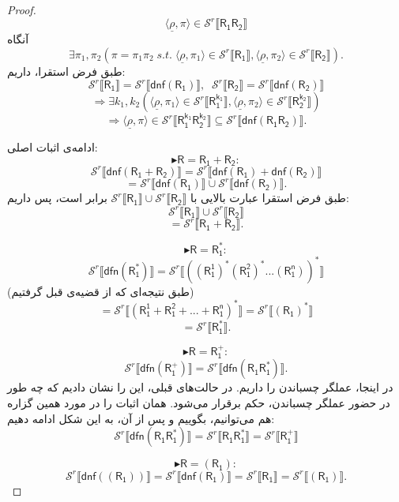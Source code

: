 \begin{proof}
	$$\langle \underline{\rho} ,\pi \rangle \in \mathcal{S}^r \llbracket \mathsf{R_1 R_2} \rrbracket$$
	آنگاه
	$$\exists \pi_1, \pi_2 ( \pi = \pi_1 \pi_2\;s.t.\;
	\langle \underline{\rho} , \pi_1 \rangle \in \mathcal{S}^r \llbracket \mathsf{R_1} \rrbracket
	,\langle \underline{\rho} , \pi_2 \rangle \in \mathcal{S}^r \llbracket \mathsf{R_2} \rrbracket).$$
	طبق فرض استقرا، داریم:
	$$\mathcal{S}^r \llbracket \mathsf{R_1} \rrbracket=
	\mathcal{S}^r \llbracket \mathsf{dnf(R_1)} \rrbracket, \;\;
	\mathcal{S}^r \llbracket \mathsf{R_2} \rrbracket=
	\mathcal{S}^r \llbracket \mathsf{dnf(R_2)} \rrbracket
	$$
	$$\Rightarrow
	\exists k_1,k_2 (\langle \underline{\rho} , \pi_1 \rangle \in 
	\mathcal{S}^r \llbracket \mathsf{R_1^{k_1}} \rrbracket,
	\langle \underline{\rho} , \pi_2 \rangle \in 
	\mathcal{S}^r \llbracket \mathsf{R_2^{k_2}} \rrbracket)$$
	$$\Rightarrow
	\langle \underline{\rho} , \pi \rangle \in
	\mathcal{S}^r \llbracket \mathsf{R_1^{k_1} R_2^{k_2}} \rrbracket
	\subseteq \mathcal{S}^r \llbracket \mathsf{dnf(R_1 R_2)} \rrbracket.
	$$ 
	
	ادامه‌ی اثبات اصلی:
	$$\blacktriangleright \mathsf{R=R_1 + R_2:}$$	
	$$\mathcal{S}^r \llbracket \mathsf{dnf(R_1+R_2)} \rrbracket=
	\mathcal{S}^r \llbracket \mathsf{dnf(R_1)+dnf(R_2)} \rrbracket$$
	$$=\mathcal{S}^r \llbracket \mathsf{dnf(R_1)} \rrbracket \cup
	\mathcal{S}^r \llbracket \mathsf{dnf(R_2)} \rrbracket.$$
	طبق فرض استقرا عبارت بالایی با 
	$\mathcal{S}^r \llbracket \mathsf{R_1} \rrbracket \cup
	\mathcal{S}^r \llbracket \mathsf{R_2} \rrbracket$
	برابر است، پس داریم:
	$$\mathcal{S}^r \llbracket \mathsf{R_1} \rrbracket \cup
	\mathcal{S}^r \llbracket \mathsf{R_2} \rrbracket$$
	$$=\mathcal{S}^r \llbracket \mathsf{R_1+R_2} \rrbracket.$$
	
	$$\blacktriangleright \mathsf{R=R_1^*:}$$
	$$\mathcal{S}^r \llbracket \mathsf{dfn(R_1^*)} \rrbracket=\mathcal{S}^r \llbracket \mathsf{((R_1^1)^* (R_1^2)^* ... (R_1^n))^*} \rrbracket$$
	(طبق نتیجه‌ای که از قضیه‌ی قبل گرفتیم)
	$$=\mathcal{S}^r \llbracket \mathsf{(R_1^1+R_1^2+...+R_1^n)^*} \rrbracket=\mathcal{S}^r \llbracket \mathsf{(R_1)^*} \rrbracket$$
	$$=\mathcal{S}^r \llbracket \mathsf{R_1^*} \rrbracket.$$
	
	$$\blacktriangleright \mathsf{R=R_1^+:}$$
	$$\mathcal{S}^r \llbracket \mathsf{dfn(R_1^+)} \rrbracket=\mathcal{S}^r \llbracket \mathsf{dfn(R_1 R_1^*)} \rrbracket.$$
	در اینجا، عملگر چسباندن را داریم. در حالت‌های قبلی، این را نشان دادیم که چه‌ طور در حضور عملگر چسباندن، حکم برقرار می‌شود. همان اثبات را در مورد همین گزاره هم می‌توانیم، بگوییم و پس از آن، به این شکل ادامه دهیم:
	$$\mathcal{S}^r \llbracket \mathsf{dfn(R_1 R_1^*)} \rrbracket=
	\mathcal{S}^r \llbracket \mathsf{R_1 R_1^*} \rrbracket=
	\mathcal{S}^r \llbracket \mathsf{R_1^+} \rrbracket$$
	
	$$\blacktriangleright \mathsf{R=(R_1):}$$
	$$\mathcal{S}^r \llbracket \mathsf{dnf((R_1))} \rrbracket=\mathcal{S}^r \llbracket \mathsf{dnf(R_1)} \rrbracket=\mathcal{S}^r \llbracket \mathsf{R_1} \rrbracket=\mathcal{S}^r \llbracket \mathsf{(R_1)} \rrbracket.$$
\end{proof}


